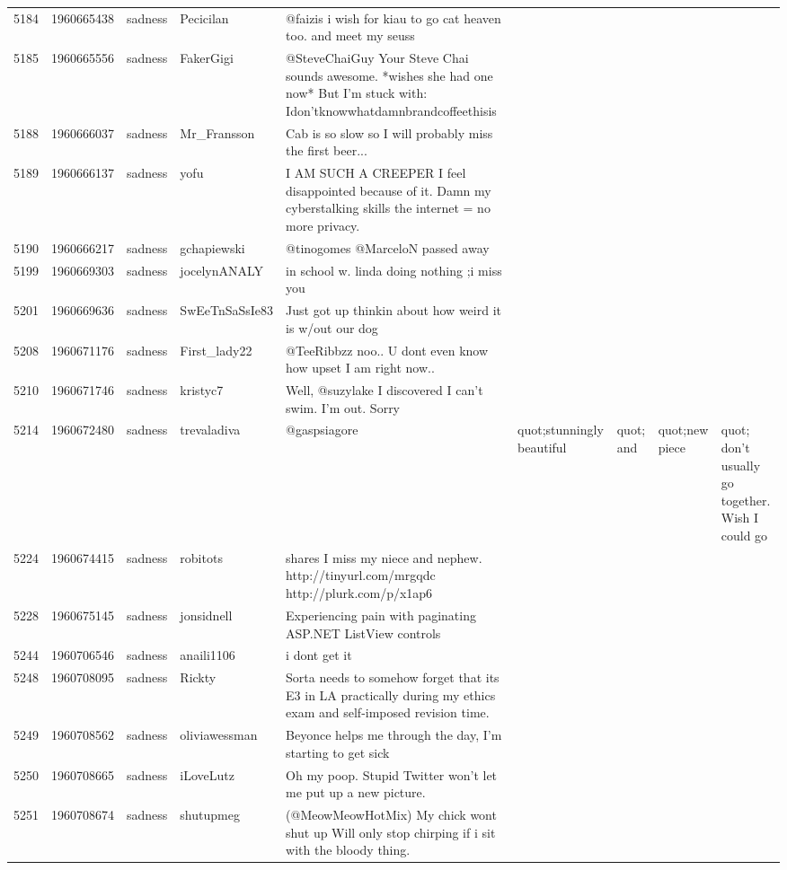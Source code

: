 \begin{tabular}{lrlll}
5184 & 1960665438 & sadness & Pecicilan & @faizis i wish for kiau to go cat heaven too. and meet my seuss \\
5185 & 1960665556 & sadness & FakerGigi & @SteveChaiGuy Your Steve Chai sounds awesome. *wishes she had one now* But I'm stuck with: Idon'tknowwhatdamnbrandcoffeethisis \\
5188 & 1960666037 & sadness & Mr_Fransson & Cab is so slow so I will probably miss the first beer... \\
5189 & 1960666137 & sadness & yofu & I AM SUCH A CREEPER  I feel disappointed because of it. Damn my cyberstalking skills   the internet = no more privacy. \\
5190 & 1960666217 & sadness & gchapiewski & @tinogomes @MarceloN passed away \\
5199 & 1960669303 & sadness & jocelynANALY & in school w. linda doing nothing  ;i miss you \\
5201 & 1960669636 & sadness & SwEeTnSaSsIe83 & Just got up thinkin about how weird it is w/out our dog \\
5208 & 1960671176 & sadness & First_lady22 & @TeeRibbzz noo.. U dont even know how upset I am right now.. \\
5210 & 1960671746 & sadness & kristyc7 & Well, @suzylake I discovered I can't swim.  I'm out.  Sorry \\
5214 & 1960672480 & sadness & trevaladiva & @gaspsiagore &quot;stunningly beautiful&quot; and &quot;new piece&quot; don't usually go together. Wish I could go \\
5224 & 1960674415 & sadness & robitots & shares I miss my niece and nephew. http://tinyurl.com/mrgqdc http://plurk.com/p/x1ap6 \\
5228 & 1960675145 & sadness & jonsidnell & Experiencing pain with paginating ASP.NET ListView controls \\
5244 & 1960706546 & sadness & anaili1106 & i dont get it \\
5248 & 1960708095 & sadness & Rickty & Sorta needs to somehow forget that its E3 in LA practically during my ethics exam and self-imposed revision time. \\
5249 & 1960708562 & sadness & oliviawessman & Beyonce helps me through the day, I'm starting to get sick \\
5250 & 1960708665 & sadness & iLoveLutz & Oh my poop. Stupid Twitter won't let me put up a new picture. \\
5251 & 1960708674 & sadness & shutupmeg & (@MeowMeowHotMix) My chick wont shut up  Will only stop chirping if i sit with the bloody thing. \\

\end{tabular}
